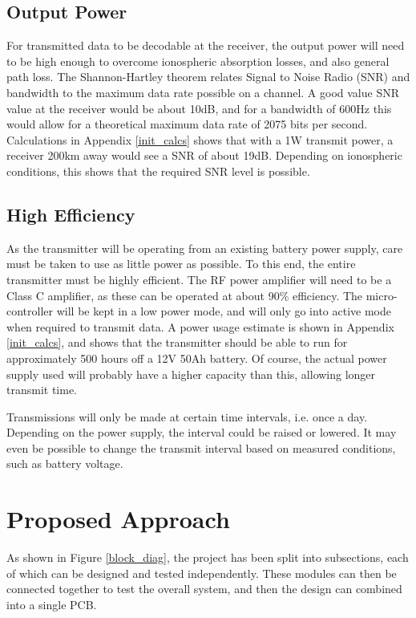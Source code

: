 \documentclass[a4paper,12pt]{article}
\begin{document}
\subsection{Output Power}
For transmitted data to be decodable at the receiver, the output power will need to be high enough to overcome ionospheric absorption losses, and also general path loss. The Shannon-Hartley theorem relates Signal to Noise Radio (SNR) and bandwidth to the maximum data rate possible on a channel. A good value SNR value at the receiver would be about 10dB, and for a bandwidth of 600Hz this would allow for a theoretical maximum data rate of 2075 bits per second. Calculations in Appendix \ref{init_calcs} shows that with a 1W transmit power, a receiver 200km away would see a SNR of about 19dB. Depending on ionospheric conditions, this shows that the required SNR level is possible.

\subsection{High Efficiency}
As the transmitter will be operating from an existing battery power supply, care must be taken to use as little power as possible. To this end, the entire transmitter must be highly efficient. The RF power amplifier will need to be a Class C amplifier, as these can be operated at about 90\% efficiency. The micro-controller will be kept in a low power mode, and will only go into active mode when required to transmit data. A power usage estimate is shown in Appendix \ref{init_calcs}, and shows that the transmitter should be able to run for approximately 500 hours off a 12V 50Ah battery. Of course, the actual power supply used will probably have a higher capacity than this, allowing longer transmit time.

Transmissions will only be made at certain time intervals, i.e. once a day. Depending on the power supply, the interval could be raised or lowered. It may even be possible to change the transmit interval based on measured conditions, such as battery voltage.

\section{Proposed Approach}
As shown in Figure \ref{block_diag}, the project has been split into subsections, each of which can be designed and tested independently. These modules can then be connected together to test the overall system, and then the design can combined into a single PCB.
\end{document}
